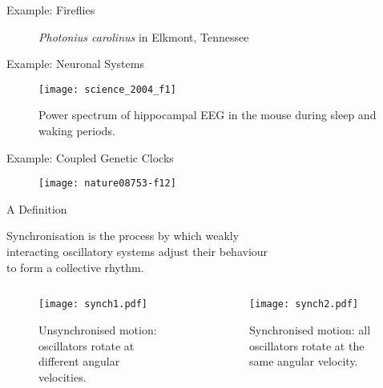 \documentclass[10pt,reqno]{beamer}
\newcommand{\includemovie}[3]{%
	\includemedia[%
	width=#1,height=#2,%
	activate=pagevisible,%
	deactivate=pageclose,%
	addresource=#3,%
	flashvars={%
		src=#3 %
		&autoPlay=true %
		&loop=true %
		&controlBarAutoHideTimeout=0 %
	}%
	]{}{StrobeMediaPlayback.swf}%
}
\begin{document}
\begin{frame}{Example: Fireflies\cite{Yiu2017}}
\begin{figure}
\caption{\emph{Photonius carolinus} in Elkmont, Tennessee}
\end{figure}
\end{frame}
\begin{frame}{Example: Neuronal Systems\cite{Buzsaki:2004aa}}
\begin{figure}
\texttt{[image: science\_2004\_f1]}
\caption{Power spectrum of hippocampal EEG in the mouse during sleep and waking periods.}
\end{figure}
\end{frame}
\begin{frame}{Example: Coupled Genetic Clocks\cite{Danino:2010aa}}
\begin{figure}
\texttt{[image: nature08753-f12]}
\end{figure}
\end{frame}
\begin{frame}{A Definition}

\begin{tcolorbox}[notitle, boxrule=0pt, colback=lred]
\centering
	Synchronisation is the process by which weakly\\ interacting oscillatory systems adjust their behaviour\\ to form a collective rhythm.
\end{tcolorbox}
	\begin{columns}
		\scriptsize
	\begin{column}{0.49\textwidth}
		\begin{figure}
			\texttt{[image: synch1.pdf]}
			\caption{Unsynchronised motion: oscillators rotate at different angular velocities.}
		\end{figure}
	\end{column}
	\begin{column}{0.49\textwidth}
		\begin{figure}
			\texttt{[image: synch2.pdf]}
			\caption{Synchronised motion: all oscillators rotate at the same angular velocity.}
		\end{figure}
	\end{column}
\end{columns}
\end{frame}
\end{document}
